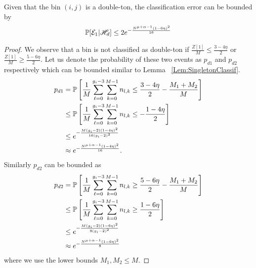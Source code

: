 \begin{lemma}
\label{Lem:DoubletonClassif}
Given that the bin $(i,j)$ is a double-ton, the classification error can be bounded by
\begin{align*}
\mathbb{P}[\mathcal{E}_1|\mathscr{H}_d]\leq 2e^{-\frac{N^{\mu+\alpha-1}(1-6\eta)^2}{16}}
\end{align*}
\end{lemma}
\begin{proof}
We observe that a bin is not classified as double-ton if $\frac{Z[1]}{M}\leq\frac{3-4\eta}{2}$ or $\frac{Z[1]}{M}\geq\frac{5-6\eta}{2}$. Let us denote the probability of these two events as $p_{d1}$ and $p_{d2}$ respectively which can be bounded similar to Lemma ~\ref{Lem:SingletonClassif}.
\begin{align*}
p_{d1}&=\mathbb{P}\left[\frac{1}{M}\sum\limits_{\ell=0}^{g_{i}-3}\sum\limits_{k=0}^{M-1} n_{l,k}\leq\frac{3-4\eta}{2}-\frac{M_1+M_2}{M}\right]\\
&\leq \mathbb{P}\left[\frac{1}{M}\sum\limits_{\ell=0}^{g_{i}-3}\sum\limits_{k=0}^{M-1} n_{l,k}\leq-\frac{1-4\eta}{2}\right]\\
&\leq e^{-\frac{M(g_i-2)(1-4\eta)^2}{16(g_i-2)^{2}}}\\
&\approx e^{-\frac{N^{\mu+\alpha-1}(1-4\eta)^2}{16}}.
\end{align*} 
Similarly $p_{d2}$ can be bounded as 
\begin{align*}
p_{d2}&=\mathbb{P}\left[\frac{1}{M}\sum\limits_{\ell=0}^{g_{i}-3}\sum\limits_{k=0}^{M-1} n_{l,k}\geq\frac{5-6\eta}{2}-\frac{M_1+M_2}{M}\right]\\
&\leq \mathbb{P}\left[\frac{1}{M}\sum\limits_{\ell=0}^{g_{i}-3}\sum\limits_{k=0}^{M-1} n_{l,k}\geq\frac{1-6\eta}{2}\right]\\
&\leq e^{-\frac{M(g_i-2)(1-6\eta)^2}{8(g_i-2)^{2}}}\\
&\approx e^{-\frac{N^{\mu+\alpha-1}(1-6\eta)^2}{8}}
\end{align*} 
where we use the lower bounds $M_1,M_2\leq M$.
\end{proof}

